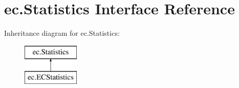 \hypertarget{interfaceec_1_1_statistics}{}\section{ec.\+Statistics Interface Reference}
\label{interfaceec_1_1_statistics}
Inheritance diagram for ec.\+Statistics\+:\begin{figure}[H]
\begin{center}
\leavevmode
\includegraphics[height=2.000000cm]{interfaceec_1_1_statistics}
\end{center}
\end{figure}
